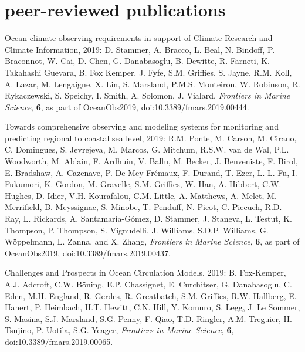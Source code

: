 \section*{\sc \color{Maroon} peer-reviewed publications}

\small 

\begin{etaremune}

\item Ocean climate observing requirements in support of Climate Research and Climate Information, 2019: D. Stammer, A. Bracco, L. Beal, N. Bindoff, P. Braconnot, W. Cai, D. Chen, G. Danabasoglu, B. Dewitte, R. Farneti, K. Takahashi Guevara, B. Fox Kemper, J. Fyfe, S.M. Grif\/f\/ies, S. Jayne, R.M. Koll, A. Lazar, M. Lengaigne, X. Lin, S. Marsland, P.M.S. Monteiron, W. Robinson, R. Rykaczewski, S. Speichy, I. Smith, A. Solomon, J. Vialard, {\it Frontiers in Marine Science}, {\bf 6},  as part of OceanObs2019, doi:10.3389/fmars.2019.00444.

\item Towards comprehensive observing and modeling systems for monitoring and predicting regional to coastal sea level, 2019: R.M. Ponte, M. Carson, M. Cirano, C. Domingues, S. Jevrejeva, M. Marcos, G. Mitchum, R.S.W. van de Wal, P.L. Woodworth, M. Ablain, F. Ardhuin, V. Ballu, M. Becker, J. Benveniste, F. Birol, E. Bradshaw, A. Cazenave, P. De Mey-{Fr\'{e}maux}, F. Durand, T. Ezer, L.-L. Fu, I. Fukumori, K. Gordon, M. Gravelle, S.M. Grif\/f\/ies, W. Han, A. Hibbert, C.W. Hughes, D. Idier, V.H. Kourafalou, C.M. Little, A. Matthews, A. Melet, M. Merrifield, B. Meyssignac, S. Minobe, T. Penduff, N. Picot, C. Piecuch, R.D. Ray, L. Rickards, A. Santamaría-Gómez, D. Stammer, J. Staneva, L. Testut, K. Thompson, P. Thompson, S. Vignudelli, J. Williams, S.D.P. Williams, G. {W\"{o}ppelmann}, L. Zanna, and X. Zhang, {\it Frontiers in Marine Science}, {\bf 6},  as part of 
OceanObs2019, doi:10.3389/fmars.2019.00437.

\item Challenges and Prospects in Ocean Circulation Models, 2019: B. Fox-Kemper, A.J. Adcroft, C.W. {B\"{o}ning}, E.P. Chassignet, E. Curchitser, G. Danabasoglu, C. Eden, M.H. England, R. Gerdes, R. Greatbatch, S.M. Grif\/f\/ies, R.W. Hallberg, E. Hanert, P. Heimbach, H.T. Hewitt, C.N. Hill, Y. Komuro, S. Legg, J. Le Sommer, S. Masina, S.J. Marsland, S.G. Penny, F. Qiao, T.D. Ringler, A.M. Treguier, H. Tsujino, P. Uotila, S.G. Yeager,
{\it Frontiers in Marine Science}, {\bf 6},
doi:10.3389/fmars.2019.00065.


\end{etaremune}
